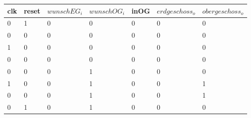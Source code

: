 \documentclass[a4paper,12pt,bibtotocnumbered]{scrartcl} %
\numberwithin{equation}{section} %
\begin{document}
\begin{table}[H]
	\begin{tabular}{lllll|ll}
		clk & reset & $wunschEG_i$ & $wunschOG_i$ & \multicolumn{1}{l|}{inOG} & $erdgeschoss_o$ & $obergeschoss_o$ \\ \hline
		0   & 1     & 0        & 0        & \multicolumn{1}{l|}{0}    & 0              & 0               \\
		0   & 0     & 0        & 0        & \multicolumn{1}{l|}{0}    & 0              & 0               \\
		1   & 0     & 0        & 0        & \multicolumn{1}{l|}{0}    & 0              & 0               \\
		0   & 0     & 0        & 0        & \multicolumn{1}{l|}{0}    & 0              & 0               \\
		0   & 0     & 0        & 1        & \multicolumn{1}{l|}{0}    & 0              & 0               \\ \hline
		1   & 0     & 0        & 1        & \multicolumn{1}{l|}{0}    & 0              & 1               \\
		0   & 0     & 0        & 1        & \multicolumn{1}{l|}{0}    & 0              & 1               \\
		0   & 1     & 0        & 1        & \multicolumn{1}{l|}{0}    & 0              & 0
	\end{tabular}
\end{table}
\newpage
\end{document}
